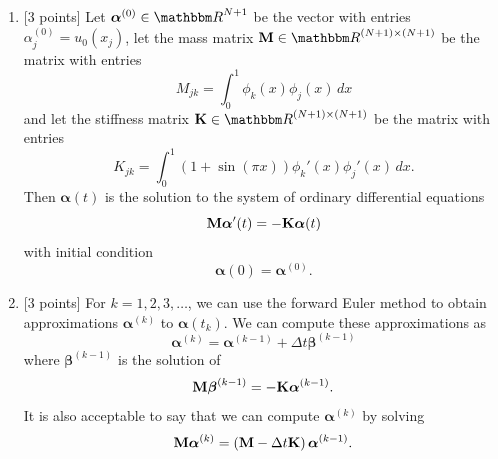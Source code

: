 \begin{solution}

\begin{enumerate}
\item {[3 points]} Let $\boldsymbol{\alpha}^{(0)}\in\R^{N+1}$ be the vector with entries $\alpha_j^{(0)}=u_0(x_j)$, let the mass matrix $\BM\in\R^{\left(N+1\right)\times\left(N+1\right)}$ be the matrix with entries
\[
M_{jk}=\int_0^1\phi_k(x)\phi_j(x)\,dx
\]
and let the stiffness matrix $\BK\in\R^{\left(N+1\right)\times\left(N+1\right)}$ be the matrix with entries
\[
K_{jk}=\int_0^1(1+\sin(\pi x))\phi_k'(x)\phi_j'(x)\,dx.
\]
Then $\boldsymbol{\alpha}(t)$ is the solution to the system of ordinary differential equations
\[
{\bf M}\boldsymbol{\alpha}'(t)=-{\bf K}\boldsymbol{\alpha}(t)
\]
with initial condition
\[
\boldsymbol{\alpha}(0)=\boldsymbol{\alpha}^{(0)}.
\]

\vspace*{1em}
\item {[3 points]} For $k=1,2,3,\ldots$, we can use the forward Euler method to obtain approximations $\boldsymbol{\alpha}^{(k)}$ to $\boldsymbol{\alpha}(t_k)$. We can compute these approximations as
\[
\boldsymbol{\alpha}^{(k)}=\boldsymbol{\alpha}^{(k-1)}+\Delta t\boldsymbol{\beta}^{(k-1)}
\]
where $\boldsymbol{\beta}^{(k-1)}$ is the solution of
\[
{\bf M}\boldsymbol{\beta}^{(k-1)}=-{\bf K}\boldsymbol{\alpha}^{(k-1)}.
\]
It is also acceptable to say that we can compute $\boldsymbol{\alpha}^{(k)}$ by solving
\[
{\bf M}\boldsymbol{\alpha}^{(k)}=\left({\bf M}-\Delta t{\bf K}\right)\boldsymbol{\alpha}^{(k-1)}.
\]


\end{enumerate}
\end{solution}

